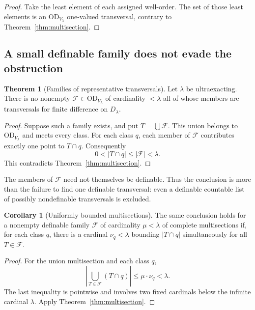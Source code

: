 \documentclass[11pt,letterpaper]{article}
\theoremstyle{definition}
\newtheorem{theorem}[definition]{Theorem}
\newtheorem{corollary}[definition]{Corollary}
\numberwithin{equation}{section}
\newcommand{\OD}{\mathrm{OD}}
\begin{document}
\begin{proof}
Take the least element of each assigned well-order. The set of those least elements is an $\OD_{V_\lambda}$ one-valued transversal, contrary to Theorem~\ref{thm:multisection}.
\end{proof}

\subsection{A small definable family does not evade the obstruction}

\begin{theorem}[Families of representative transversals]\label{thm:transversalfamily}
Let $\lambda$ be ultraexacting. There is no nonempty
$\mathcal F\in\OD_{V_\lambda}$ of cardinality $<\lambda$ all of whose members are transversals for finite difference on $D_\lambda$.
\end{theorem}

\begin{proof}
Suppose such a family exists, and put $T=\bigcup\mathcal F$. This union belongs to $\OD_{V_\lambda}$ and meets every class. For each class $q$, each member of $\mathcal F$ contributes exactly one point to $T\cap q$. Consequently
\[
 0<|T\cap q|\le|\mathcal F|<\lambda.
\]
This contradicts Theorem~\ref{thm:multisection}.
\end{proof}

The members of $\mathcal F$ need not themselves be definable. Thus the conclusion is more than the failure to find one definable transversal: even a definable countable list of possibly nondefinable transversals is excluded.

\begin{corollary}[Uniformly bounded multisections]\label{cor:boundedfamily}
The same conclusion holds for a nonempty definable family $\mathcal F$ of cardinality $\mu<\lambda$ of complete multisections if, for each class $q$, there is a cardinal $\nu_q<\lambda$ bounding $|T\cap q|$ simultaneously for all $T\in\mathcal F$.
\end{corollary}

\begin{proof}
For the union multisection and each class $q$,
\[
 \left|\bigcup_{T\in\mathcal F}(T\cap q)\right|
 \le\mu\cdot\nu_q<\lambda.
\]
The last inequality is pointwise and involves two fixed cardinals below the infinite cardinal $\lambda$. Apply Theorem~\ref{thm:multisection}.
\end{proof}
\end{document}
